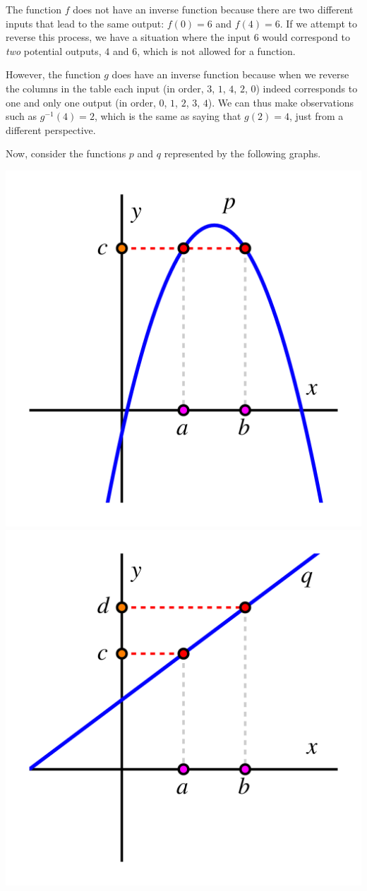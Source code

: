 \documentclass[nooutcomes]{ximera}
\begin{document}
The function $f$ does not have an inverse function because there are two different inputs that lead to the same output:  $f(0) = 6$ and $f(4) = 6$.  If we attempt to reverse this process, we have a situation where the input $6$ would correspond to \emph{two} potential outputs, $4$ and $6$, which is not allowed for a function. 

However, the function $g$ does have an inverse function because when we reverse the columns in the table each input (in order, $3$, $1$, $4$, $2$, $0$) indeed corresponds to one and only one output (in order, $0$, $1$, $2$, $3$, $4$).  We can thus make observations such as $g^{-1}(4) = 2$, which is the same as saying that $g(2) = 4$, just from a different perspective.

Now, consider the functions  $p$ and $q$ represented by the following graphs.

\begin{image}
\includegraphics[width=.7\textwidth]{inverse-does-it-1.jpg}
\includegraphics[width=.7\textwidth]{inverse-does-it-2.jpg}
\end{image}
\end{document}
